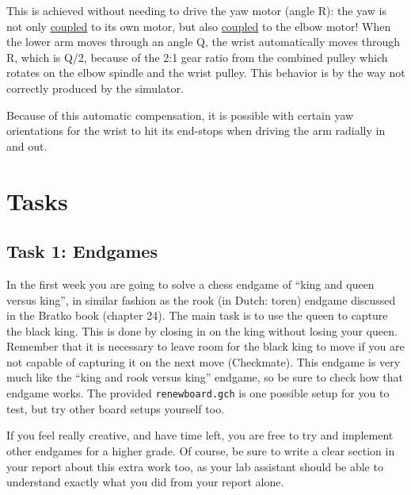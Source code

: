 \documentclass[10pt]{scrartcl}
\begin{document}
This is achieved without needing to drive the yaw motor (angle R): the
yaw is not only \underline{coupled} to its own motor, but also
\underline{coupled} to the elbow motor! When the lower arm moves through
an angle Q, the wrist automatically moves through R, which is Q/2,
because of the 2:1 gear ratio from the combined pulley which rotates on
the elbow spindle and the wrist pulley. This behavior is by the way not
correctly produced by the simulator.

Because of this automatic compensation, it is possible with certain yaw
orientations for the wrist to hit its end-stops when driving the arm
radially in and out.

\section{Tasks}
\label{sec:Tasks}
\subsection{Task 1: Endgames}
\label{sec:Endgames}


In the first week you are going to solve a chess endgame of ``king and
queen versus king'', in similar fashion as the rook (in Dutch: toren)
endgame discussed in the Bratko book (chapter 24). 
The main task is to use the queen to capture the black king. This is done by closing in on the king without losing your queen.
Remember that it is necessary to leave room for the black king to move if you are not capable of capturing it on the next move (Checkmate).
This endgame is very much like the ``king and rook versus king'' endgame, so be sure to check how that endgame works.
The provided \verb|renewboard.gch| is one possible setup for you to test,
but try other board setups yourself too.
 
If you feel really creative, and have time left, you are free to try and
implement other endgames for a higher grade.
Of course, be sure to write a clear section in your report about this extra work too,
as your lab assistant should be able to understand exactly what you did from your
report alone.
\end{document}
